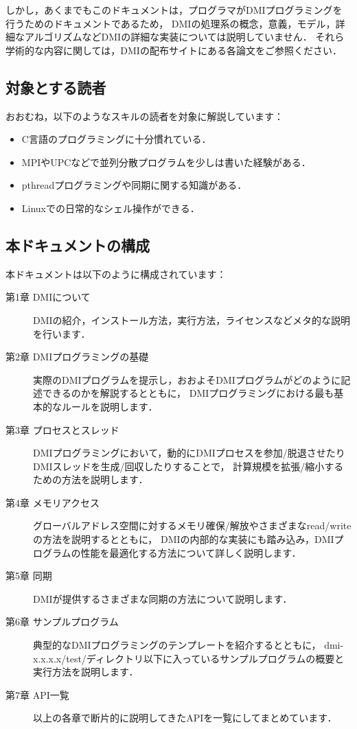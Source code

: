 \documentclass[report,12pt]{jsbook}
\begin{document}
しかし，あくまでもこのドキュメントは，プログラマがDMIプログラミングを行うためのドキュメントであるため，
DMIの処理系の概念，意義，モデル，詳細なアルゴリズムなどDMIの詳細な実装については説明していません．
それら学術的な内容に関しては，DMIの配布サイトにある各論文をご参照ください．

\subsection{対象とする読者}

おおむね，以下のようなスキルの読者を対象に解説しています：

\begin{itemize}
\item C言語のプログラミングに十分慣れている．
\item MPIやUPCなどで並列分散プログラムを少しは書いた経験がある．
\item pthreadプログラミングや同期に関する知識がある．
\item Linuxでの日常的なシェル操作ができる．
\end{itemize}

\subsection{本ドキュメントの構成}

本ドキュメントは以下のように構成されています：

\begin{description}
\item[第1章 DMIについて] DMIの紹介，インストール方法，実行方法，ライセンスなどメタ的な説明を行います．
\item[第2章 DMIプログラミングの基礎] 実際のDMIプログラムを提示し，おおよそDMIプログラムがどのように記述できるのかを解説するとともに，
  DMIプログラミングにおける最も基本的なルールを説明します．
\item[第3章 プロセスとスレッド] DMIプログラミングにおいて，動的にDMIプロセスを参加/脱退させたりDMIスレッドを生成/回収したりすることで，
  計算規模を拡張/縮小するための方法を説明します．
\item[第4章 メモリアクセス] グローバルアドレス空間に対するメモリ確保/解放やさまざまなread/writeの方法を説明するとともに，
  DMIの内部的な実装にも踏み込み，DMIプログラムの性能を最適化する方法について詳しく説明します．
\item[第5章 同期] DMIが提供するさまざまな同期の方法について説明します．
\item[第6章 サンプルプログラム] 典型的なDMIプログラミングのテンプレートを紹介するとともに，
  dmi-x.x.x.x/test/ディレクトリ以下に入っているサンプルプログラムの概要と実行方法を説明します．
\item[第7章 API一覧] 以上の各章で断片的に説明してきたAPIを一覧にしてまとめています．
\end{description}
\end{document}
